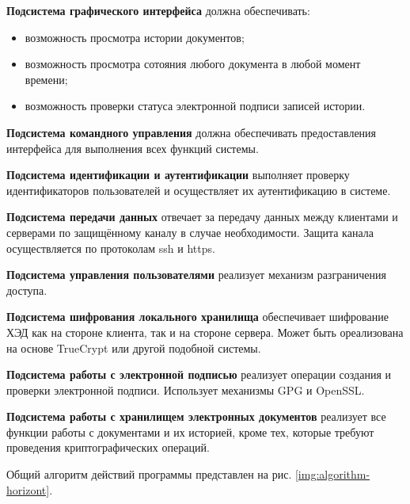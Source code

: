 \vspace{\baselineskip}
\textbf{Подсистема графического интерфейса} должна обеспечивать:
\begin{itemize}
	\item возможность просмотра истории документов;
	\item возможность просмотра сотояния любого документа в любой момент времени;
	\item возможность проверки статуса электронной подписи записей истории.
\end{itemize}

\vspace{\baselineskip}
\textbf{Подсистема командного управления} должна обеспечивать предоставления интерфейса для выполнения всех функций системы.

\vspace{\baselineskip}
\textbf{Подсистема идентификации и аутентификации} выполняет проверку идентификаторов пользователей и осуществляет их аутентификацию в системе.

\vspace{\baselineskip}
\textbf{Подсистема передачи данных} отвечает за передачу данных между клиентами и серверами по защищённому каналу в случае необходимости. Защита канала осуществляется по протоколам ssh и https.

\vspace{\baselineskip}
\textbf{Подсистема управления пользователями} реализует механизм разграничения доступа.

\vspace{\baselineskip}
\textbf{Подсистема шифрования локального хранилища} обеспечивает шифрование ХЭД как на стороне клиента, так и на стороне сервера. Может быть ореализована на основе TrueCrypt или другой подобной системы.

\vspace{\baselineskip}
\textbf{Подсистема работы с электронной подписью} реализует операции создания и проверки электронной подписи. Использует механизмы GPG и OpenSSL.

\vspace{\baselineskip}
\textbf{Подсистема работы с хранилищем электронных документов} реализует все функции работы с документами и их историей, кроме тех, которые требуют проведения криптографических операций.

\vspace{\baselineskip}
Общий алгоритм действий программы представлен на рис. \ref{img:algorithm-horizont}.

